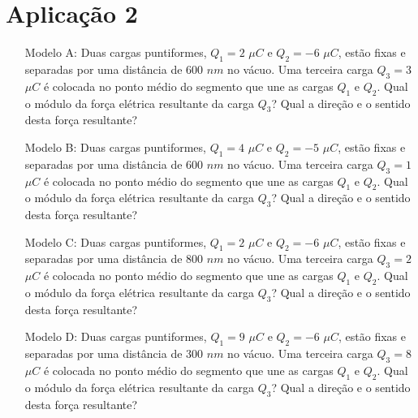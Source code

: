 \section{Aplicação 2} \label{ch:ASA3a2}
\begin{itemize}
    \item[Modelo A:] Duas cargas puntiformes, $Q_1 = 2$ $\mu C$ e $Q_2 = -6$ $\mu C$, estão fixas e separadas por uma distância de $600$ $nm$ no vácuo. Uma terceira carga $Q_3 = 3$ $\mu C$ é colocada no ponto médio do segmento que une as cargas $Q_1$ e $Q_2$. Qual o módulo da força elétrica resultante da carga $Q_3$? Qual a direção e o sentido desta força resultante?
    
    \item[Modelo B:] Duas cargas puntiformes, $Q_1 = 4$ $\mu C$ e $Q_2 = -5$ $\mu C$, estão fixas e separadas por uma distância de $600$ $nm$ no vácuo. Uma terceira carga $Q_3 = 1$ $\mu C$ é colocada no ponto médio do segmento que une as cargas $Q_1$ e $Q_2$. Qual o módulo da força elétrica resultante da carga $Q_3$? Qual a direção e o sentido desta força resultante?
    
    \item[Modelo C:] Duas cargas puntiformes, $Q_1 = 2$ $\mu C$ e $Q_2 = -6$ $\mu C$, estão fixas e separadas por uma distância de $800$ $nm$ no vácuo. Uma terceira carga $Q_3 = 2$ $\mu C$ é colocada no ponto médio do segmento que une as cargas $Q_1$ e $Q_2$. Qual o módulo da força elétrica resultante da carga $Q_3$? Qual a direção e o sentido desta força resultante?
    
    \item[Modelo D:] Duas cargas puntiformes, $Q_1 = 9$ $\mu C$ e $Q_2 = -6$ $\mu C$, estão fixas e separadas por uma distância de $300$ $nm$ no vácuo. Uma terceira carga $Q_3 = 8$ $\mu C$ é colocada no ponto médio do segmento que une as cargas $Q_1$ e $Q_2$. Qual o módulo da força elétrica resultante da carga $Q_3$? Qual a direção e o sentido desta força resultante?
    
\end{itemize}
\newpage
